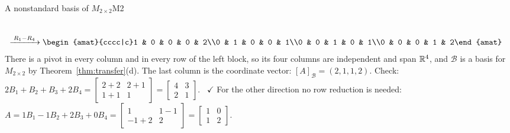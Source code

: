 \documentclass[11pt]{article}
\begin{document}
\begin{exmp}{A nonstandard basis of $M_{2\times2}$}{M2}
\begin{align*}
\\[4pt]
&\rops{R_1-R_4}
\begin{amat}{cccc|c}1 & 0 & 0 & 0 & 2\\0 & 1 & 0 & 0 & 1\\0 & 0 & 1 & 0 & 1\\0 & 0 & 0 & 1 & 2\end{amat}
\end{align*}
There is a pivot in every column and in every row of the left block, so its four columns are independent and span $\mathbb{R}^4$, and $\mathcal{B}$ is a basis for $M_{2\times2}$ by Theorem~\ref{thm:transfer}(d). The last column is the coordinate vector: $[A]_{\mathcal{B}}=(2,1,1,2)$. Check: $2B_1+B_2+B_3+2B_4=\begin{bmatrix}2+2&2+1\\1+1&1\end{bmatrix}=\begin{bmatrix}4&3\\2&1\end{bmatrix}$. \ $\checkmark$ For the other direction no row reduction is needed: $A=1B_1-1B_2+2B_3+0B_4=\begin{bmatrix}1&1-1\\-1+2&2\end{bmatrix}=\begin{bmatrix}1&0\\1&2\end{bmatrix}$.
\end{exmp}
\end{document}

